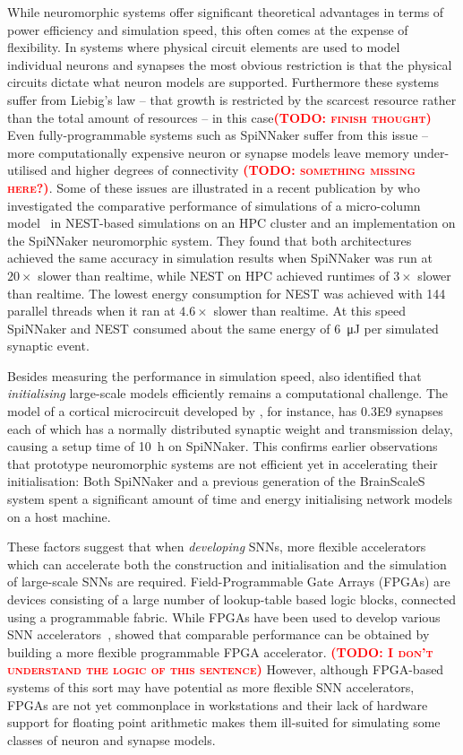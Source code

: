 \documentclass[utf8]{frontiersSCNS} %
\newcommand{\todo}[1]{\textbf{\textsc{\textcolor{red}{(TODO: #1)}}}}
\begin{document}
While neuromorphic systems offer significant theoretical advantages in terms of power efficiency and simulation speed, this often comes at the expense of flexibility.
In systems where physical circuit elements are used to model individual neurons and synapses the most obvious restriction is that the physical circuits dictate what neuron models are supported.
Furthermore these systems suffer from Liebig's law -- that growth is restricted by the scarcest resource rather than the total amount of resources -- in this case\todo{finish thought}
Even fully-programmable systems such as SpiNNaker suffer from this issue -- more computationally expensive neuron or synapse models leave memory under-utilised and higher degrees of connectivity \todo{something missing here?}.
Some of these issues are illustrated in a recent publication by \citet{VanAlbada2018} who investigated the comparative performance of simulations of a micro-column model~\citep{Potjans2012} in NEST-based simulations on an HPC cluster and an implementation on the SpiNNaker neuromorphic system.
They found that both architectures achieved the same accuracy in simulation results when SpiNNaker was run at $20\times$ slower than realtime, while NEST on HPC achieved runtimes of $3\times$ slower than realtime. 
The lowest energy consumption for NEST was achieved with \num{144} parallel threads when it ran at $4.6\times$ slower than realtime. 
At this speed SpiNNaker and NEST consumed about the same energy of \SI{6}{\micro\joule} per simulated synaptic event.

Besides measuring the performance in simulation speed, \citet{VanAlbada2018} also identified that \textit{initialising} large-scale models efficiently remains a computational challenge. 
The model of a cortical microcircuit developed by \citet{Potjans2012}, for instance, has \num{0.3E9} synapses each of which has a normally distributed synaptic weight and transmission delay, causing a setup time of \SI{10}{\hour} on SpiNNaker.
This confirms earlier observations \citep{Diamond2018} that prototype neuromorphic systems are not efficient yet in accelerating their initialisation: Both SpiNNaker and a previous generation of the BrainScaleS system spent a significant amount of time and energy initialising network models on a host machine. 

These factors suggest that when \textit{developing} SNNs, more flexible accelerators which can accelerate both the construction and initialisation and the simulation of large-scale SNNs are required.
Field-Programmable Gate Arrays (FPGAs) are devices consisting of a large number of lookup-table based logic blocks, connected using a programmable fabric.
While FPGAs have been used to develop various SNN accelerators~\citep{Moore2012,Wang2018}, \citet{Naylor2013} showed that comparable performance can be obtained by building a more flexible programmable FPGA accelerator. \todo{I don't understand the logic of this sentence}
However, although FPGA-based systems of this sort may have potential as more flexible SNN accelerators, FPGAs are not yet commonplace in workstations and their lack of hardware support for floating point arithmetic makes them ill-suited for simulating some classes of neuron and synapse models. 
\end{document}
